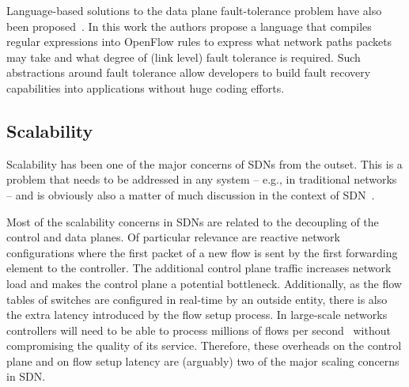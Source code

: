 
Language-based solutions to the data plane fault-tolerance problem have also been proposed~\cite{reitblatt2013}. In this work the authors propose a language that compiles regular expressions into OpenFlow rules to express what network paths packets may take and what degree of (link level) fault tolerance is required. Such abstractions around fault tolerance allow developers to build fault recovery capabilities into applications without huge coding efforts.


\subsection{Scalability}
\label{sec:scaling}

Scalability has been one of the major concerns of SDNs from the outset.
This is a problem that needs to be addressed in any system -- e.g., in traditional networks -- and is obviously also a matter of much discussion in the context of SDN~\cite{yeganeh2013}.

Most of the scalability concerns in SDNs are related to the decoupling of the control and data planes. 
Of particular relevance are reactive network configurations where the first packet of a new flow is sent by the first forwarding element to the controller.
The additional control plane traffic increases network load and makes the control plane a potential bottleneck. 
Additionally, as the flow tables of switches are configured in real-time by an outside 
entity, there is also the extra latency introduced by the flow setup process.
In large-scale networks controllers will need to be able to process millions of flows per second~\cite{Benson2010DC} without compromising the quality of its service.
Therefore, these overheads on the control plane and on flow setup latency are (arguably) two of the major scaling concerns in SDN.

